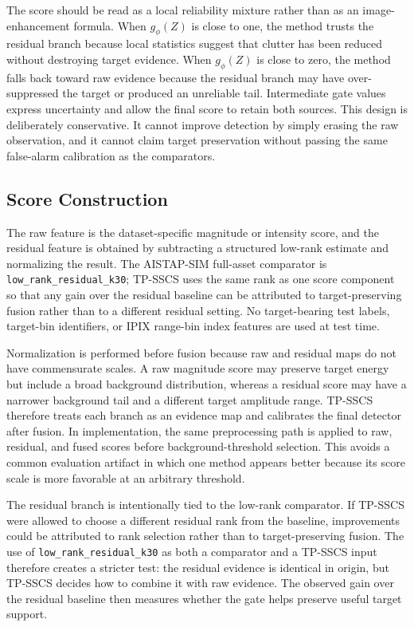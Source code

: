 \documentclass[journal]{IEEEtran}
\begin{document}
The score should be read as a local reliability mixture rather than as an image-enhancement formula. When $g_\phi(Z)$ is close to one, the method trusts the residual branch because local statistics suggest that clutter has been reduced without destroying target evidence. When $g_\phi(Z)$ is close to zero, the method falls back toward raw evidence because the residual branch may have over-suppressed the target or produced an unreliable tail. Intermediate gate values express uncertainty and allow the final score to retain both sources. This design is deliberately conservative. It cannot improve detection by simply erasing the raw observation, and it cannot claim target preservation without passing the same false-alarm calibration as the comparators.

\subsection{Score Construction}

The raw feature is the dataset-specific magnitude or intensity score, and the residual feature is obtained by subtracting a structured low-rank estimate and normalizing the result. The AISTAP-SIM full-asset comparator is \texttt{low\_rank\_residual\_k30}; TP-SSCS uses the same rank as one score component so that any gain over the residual baseline can be attributed to target-preserving fusion rather than to a different residual setting. No target-bearing test labels, target-bin identifiers, or IPIX range-bin index features are used at test time.

Normalization is performed before fusion because raw and residual maps do not have commensurate scales. A raw magnitude score may preserve target energy but include a broad background distribution, whereas a residual score may have a narrower background tail and a different target amplitude range. TP-SSCS therefore treats each branch as an evidence map and calibrates the final detector after fusion. In implementation, the same preprocessing path is applied to raw, residual, and fused scores before background-threshold selection. This avoids a common evaluation artifact in which one method appears better because its score scale is more favorable at an arbitrary threshold.

The residual branch is intentionally tied to the low-rank comparator. If TP-SSCS were allowed to choose a different residual rank from the baseline, improvements could be attributed to rank selection rather than to target-preserving fusion. The use of \texttt{low\_rank\_residual\_k30} as both a comparator and a TP-SSCS input therefore creates a stricter test: the residual evidence is identical in origin, but TP-SSCS decides how to combine it with raw evidence. The observed gain over the residual baseline then measures whether the gate helps preserve useful target support.
\end{document}
